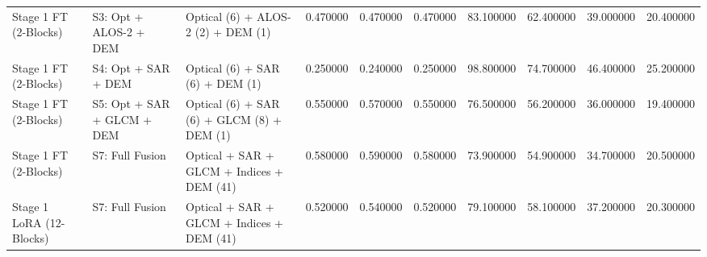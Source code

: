 \begin{tabular}{lllrrrrrrr}
Stage 1 FT (2-Blocks) & S3: Opt + ALOS-2 + DEM & Optical (6) + ALOS-2 (2) + DEM (1) & 0.470000 & 0.470000 & 0.470000 & 83.100000 & 62.400000 & 39.000000 & 20.400000 \\
Stage 1 FT (2-Blocks) & S4: Opt + SAR + DEM & Optical (6) + SAR (6) + DEM (1) & 0.250000 & 0.240000 & 0.250000 & 98.800000 & 74.700000 & 46.400000 & 25.200000 \\
Stage 1 FT (2-Blocks) & S5: Opt + SAR + GLCM + DEM & Optical (6) + SAR (6) + GLCM (8) + DEM (1) & 0.550000 & 0.570000 & 0.550000 & 76.500000 & 56.200000 & 36.000000 & 19.400000 \\
Stage 1 FT (2-Blocks) & S7: Full Fusion & Optical + SAR + GLCM + Indices + DEM (41) & 0.580000 & 0.590000 & 0.580000 & 73.900000 & 54.900000 & 34.700000 & 20.500000 \\
Stage 1 LoRA (12-Blocks) & S7: Full Fusion & Optical + SAR + GLCM + Indices + DEM (41) & 0.520000 & 0.540000 & 0.520000 & 79.100000 & 58.100000 & 37.200000 & 20.300000 \\
\bottomrule
\end{tabular}
